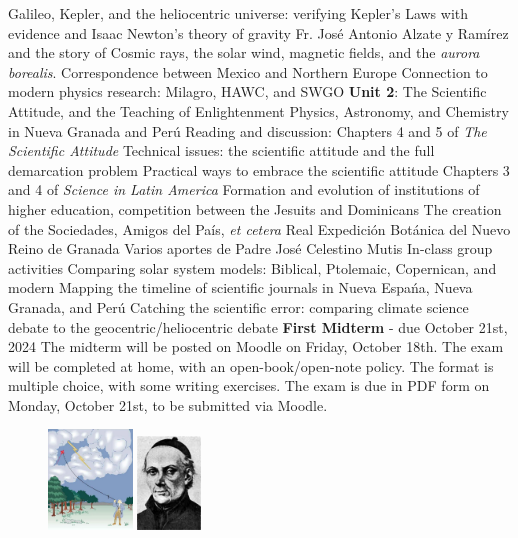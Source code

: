 \documentclass[10pt]{article}
\begin{document}
\begin{outline}[enumerate]
\3 Galileo, Kepler, and the heliocentric universe: verifying Kepler's Laws with evidence and Isaac Newton's theory of gravity
\3 Fr. Jos\'{e} Antonio Alzate y Ramírez and the story of Cosmic rays, the solar wind, magnetic fields, and the \textit{aurora borealis}.  Correspondence between Mexico and Northern Europe
\3 Connection to modern physics research: Milagro, HAWC, and SWGO
\1 \textbf{Unit 2}: The Scientific Attitude, and the Teaching of Enlightenment Physics, Astronomy, and Chemistry in Nueva Granada and Per\'{u}
\2 Reading and discussion:
\3 Chapters 4 and 5 of \textit{The Scientific Attitude}
\4 Technical issues: the scientific attitude and the full demarcation problem
\4 Practical ways to embrace the scientific attitude
\3 Chapters 3 and 4 of \textit{Science in Latin America}
\4 Formation and evolution of institutions of higher education, competition between the Jesuits and Dominicans
\4 The creation of the Sociedades, Amigos del Pa\'{i}s, \textit{et cetera}
\4 Real Expedici\'{o}n Bot\'{a}nica del Nuevo Reino de Granada
\4 Varios aportes de Padre Jos\'{e} Celestino Mutis
\2 In-class group activities
\3 Comparing solar system models: Biblical, Ptolemaic, Copernican, and modern
\3 Mapping the timeline of scientific journals in Nueva Espa\'{n}a, Nueva Granada, and Per\'{u}
\3 Catching the scientific error: comparing climate science debate to the geocentric/heliocentric debate
\1 \textbf{First Midterm} - due October 21st, 2024
\2 The midterm will be posted on Moodle on Friday, October 18th.
\2 The exam will be completed at home, with an open-book/open-note policy.  The format is multiple choice, with some writing exercises.
\2 The exam is due in PDF form on Monday, October 21st, to be submitted via Moodle.
\begin{figure}
\centering
\includegraphics[width=0.20\textwidth]{figures/franklin.png}
\includegraphics[width=0.15\textwidth]{figures/alzate_ramirez.jpg} \\

\end{figure}
\end{outline}
\end{document}
